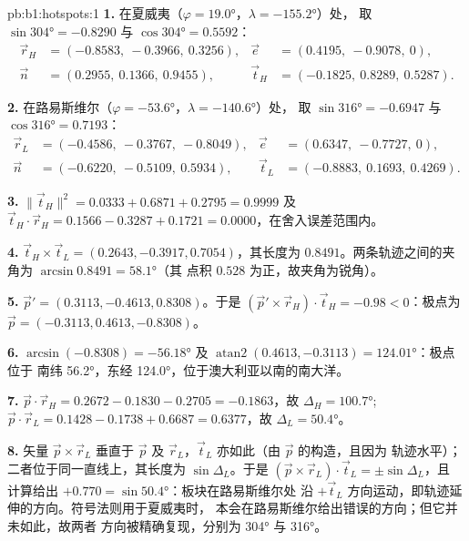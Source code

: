 \begin{solution}{pb:b1:hotspots:1}
\textbf{1.} 在夏威夷（$\varphi = \ang{19.0}$，$\lambda = \ang{-155.2}$）处，
取 $\sin\ang{304} = -0.8290$ 与 $\cos\ang{304} = 0.5592$：
\[
\begin{aligned}
  \vec r_H &= (-0.8583,\ -0.3966,\ 0.3256), &
  \vec e &= (0.4195,\ -0.9078,\ 0),\\
  \vec n &= (0.2955,\ 0.1366,\ 0.9455), &
  \vec t_H &= (-0.1825,\ 0.8289,\ 0.5287).
\end{aligned}
\]

\textbf{2.} 在路易斯维尔（$\varphi = \ang{-53.6}$，$\lambda = \ang{-140.6}$）处，
取 $\sin\ang{316} = -0.6947$ 与 $\cos\ang{316} = 0.7193$：
\[
\begin{aligned}
  \vec r_L &= (-0.4586,\ -0.3767,\ -0.8049), &
  \vec e &= (0.6347,\ -0.7727,\ 0),\\
  \vec n &= (-0.6220,\ -0.5109,\ 0.5934), &
  \vec t_L &= (-0.8883,\ 0.1693,\ 0.4269).
\end{aligned}
\]

\textbf{3.} $\lVert\vec t_H\rVert^2 = 0.0333 + 0.6871 + 0.2795 = 0.9999$ 及
$\vec t_H\cdot\vec r_H = 0.1566 - 0.3287 + 0.1721 = 0.0000$，在舍入误差范围内。

\textbf{4.} $\vec t_H\times\vec t_L = (0.2643, -0.3917, 0.7054)$，其长度为
$0.8491$。两条轨迹之间的夹角为 $\arcsin0.8491 = \ang{58.1}$（其
点积 $0.528$ 为正，故夹角为锐角）。

\textbf{5.} $\vec p' = (0.3113, -0.4613, 0.8308)$。于是
$(\vec p'\times\vec r_H)\cdot\vec t_H = -0.98 < 0$：极点为
$\vec p = (-0.3113, 0.4613, -0.8308)$。

\textbf{6.} $\arcsin(-0.8308) = \ang{-56.18}$ 及
$\operatorname{atan2}(0.4613, -0.3113) = \ang{124.01}$：极点位于
南纬 \ang{56.2}，东经 \ang{124.0}，位于澳大利亚以南的南大洋。

\textbf{7.} $\vec p\cdot\vec r_H = 0.2672 - 0.1830 - 0.2705 = -0.1863$，故
$\Delta_H = \ang{100.7}$; $\vec p\cdot\vec r_L = 0.1428 - 0.1738 + 0.6687 =
0.6377$，故 $\Delta_L = \ang{50.4}$。

\textbf{8.} 矢量 $\vec p\times\vec r_L$ 垂直于 $\vec p$ 及
$\vec r_L$，$\vec t_L$ 亦如此（由 $\vec p$ 的构造，且因为
轨迹水平）；二者位于同一直线上，其长度为
$\sin\Delta_L$。于是 $(\vec p\times\vec r_L)\cdot\vec t_L = \pm\sin\Delta_L$，且
计算给出 $+0.770 = \sin\ang{50.4}$：板块在路易斯维尔处
沿 $+\vec t_L$ 方向运动，即轨迹延伸的方向。符号法则用于夏威夷时，
本会在路易斯维尔给出错误的方向；但它并未如此，故两者
方向被精确复现，分别为 \ang{304} 与 \ang{316}。


\end{solution}
